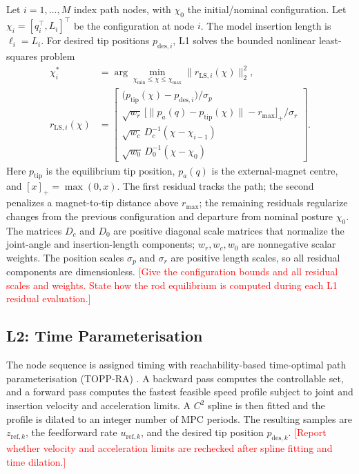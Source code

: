 \documentclass[journal]{IEEEtran}
\newcommand{\TBD}[1]{\textcolor{red}{[#1]}}
\begin{document}
Let $i=1,\ldots,M$ index path nodes, with $\chi_0$ the
initial/nominal configuration. Let $\chi_i=[q_i^\top,L_i]^\top$
be the configuration at node $i$.
The model insertion length is $\ell_i=L_i$. For desired tip positions
$p_{\mathrm{des},i}$, L1 solves the bounded nonlinear least-squares
problem
\begin{equation}
\begin{aligned}
\chi_i^* &= \arg\min_{\chi_{\min}\leq\chi\leq\chi_{\max}}
\|r_{\mathrm{LS},i}(\chi)\|_2^2,\\
r_{\mathrm{LS},i}(\chi)
&=
\begin{bmatrix}
\big(p_{\mathrm{tip}}(\chi)-p_{\mathrm{des},i}\big)/\sigma_p\\[2pt]
\sqrt{w_r}\,
\big[\|p_a(q)-p_{\mathrm{tip}}(\chi)\|-r_{\max}\big]_+/\sigma_r\\[2pt]
\sqrt{w_c}\,D_c^{-1}(\chi-\chi_{i-1})\\[2pt]
\sqrt{w_0}\,D_0^{-1}(\chi-\chi_0)
\end{bmatrix}.
\end{aligned}
\label{eq:planner}
\end{equation}
Here $p_{\mathrm{tip}}$ is the equilibrium tip position, $p_a(q)$ is
the external-magnet centre, and $[x]_+=\max(0,x)$. The first residual
tracks the path; the second penalizes a magnet-to-tip distance above
$r_{\max}$; the remaining residuals regularize changes from the
previous configuration and departure from nominal posture $\chi_0$.
The matrices $D_c$ and $D_0$ are positive diagonal scale matrices that
normalize the joint-angle and insertion-length components; $w_r,w_c,w_0$
are nonnegative scalar weights. The position scales
$\sigma_p$ and $\sigma_r$ are positive length scales, so all residual
components are dimensionless. \TBD{Give the configuration bounds and
all residual scales and weights. State how the rod equilibrium is
computed during each L1 residual evaluation.}

\subsection{L2: Time Parameterisation}
\label{sec:l2}

The node sequence is assigned timing with reachability-based
time-optimal path parameterisation (TOPP-RA)
\cite{shinmckay1985minimumtime,phampham2018reachability}. A backward
pass computes the controllable set, and a forward pass computes the
fastest feasible speed profile subject to joint and insertion velocity
and acceleration limits. A $C^2$ spline is then fitted and the profile
is dilated to an integer number of MPC periods. The resulting samples are $z_{\mathrm{ref},k}$, the feedforward rate
$u_{\mathrm{ref},k}$, and the desired tip position $p_{\mathrm{des},k}$.
\TBD{Report whether velocity and acceleration limits are rechecked after
spline fitting and time dilation.}
\end{document}
